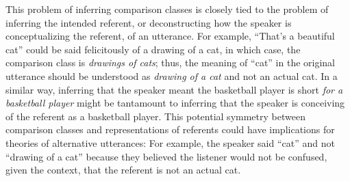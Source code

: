 \documentclass[doc]{apa6}
\begin{document}
This problem of inferring comparison classes is closely tied to the problem of inferring the intended referent, or deconstructing how the speaker is conceptualizing the referent, of an utterance.
For example, ``That's a beautiful cat'' could be said felicitously of a drawing of a cat, in which case, the comparison class is \emph{drawings of cats}; thus, the meaning of ``cat'' in the original utterance should be understood as \emph{drawing of a cat} and not an actual cat.
In a similar way, inferring that the speaker meant the basketball player is short \emph{for a basketball player} might be tantamount to inferring that the speaker is conceiving of the referent as a basketball player. 
This potential symmetry between comparison classes and representations of referents could have implications for theories of alternative utterances: For example, the speaker said ``cat'' and not ``drawing of a cat'' because they believed the listener would not be confused, given the context, that the referent is not an actual cat. 
\end{document}
